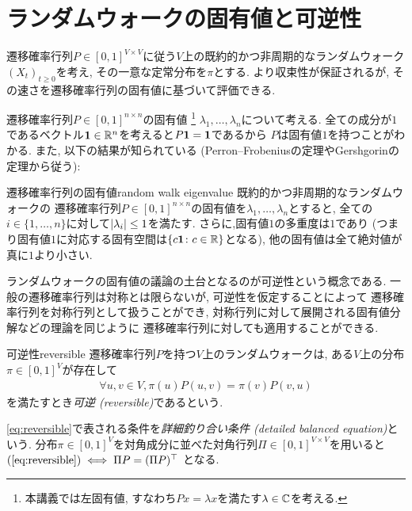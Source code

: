\section{ランダムウォークの固有値と可逆性}
遷移確率行列$P \in [0,1]^{V \times V}$に従う$V$上の既約的かつ非周期的なランダムウォーク$(X_t)_{t\ge 0}$を考え,
その一意な定常分布を$\pi$とする.
より収束性が保証されるが, その速さを遷移確率行列の固有値に基づいて評価できる.

遷移確率行列$P \in [0,1]^{n \times n}$の固有値
\footnote{本講義では左固有値, すなわち$Px=\lambda x$を満たす$\lambda\in \mathbb{C}$を考える.}
$\lambda_1,\dots,\lambda_n$について考える.
全ての成分が$1$であるベクトル$\mathbf{1}\in \mathbb{R}^n$を考えると$P\mathbf{1} = \mathbf{1}$であるから
$P$は固有値$1$を持つことがわかる.
また, 以下の結果が知られている (Perron--Frobeniusの定理やGershgorinの定理から従う):
\begin{lemma}{遷移確率行列の固有値}{random walk eigenvalue}
    既約的かつ非周期的なランダムウォークの
    遷移確率行列$P\in [0,1]^{n\times n}$の固有値を$\lambda_1,\dots,\lambda_n$とすると,
    全ての$i\in\{1,\dots,n\}$に対して$\lvert\lambda_i\rvert \le 1$を満たす.
    さらに,固有値$1$の多重度は$1$であり (つまり固有値$1$に対応する固有空間は$\{c\mathbf{1} \colon c \in \mathbb{R}\}$となる), 他の固有値は全て絶対値が真に$1$より小さい.
\end{lemma}
%

ランダムウォークの固有値の議論の土台となるのが可逆性という概念である.
一般の遷移確率行列は対称とは限らないが, 可逆性を仮定することによって
遷移確率行列を対称行列として扱うことができ,
対称行列に対して展開される固有値分解などの理論を同じように
遷移確率行列に対しても適用することができる.
%
\begin{definition}{可逆性}{reversible}
    遷移確率行列$P$を持つ$V$上のランダムウォークは,
    ある$V$上の分布$\pi \in [0,1]^V$が存在して
    \begin{align}
        \forall u,v\in V,\pi(u) P(u,v) = \pi(v) P(v,u) \label{eq:reversible}
    \end{align}
    を満たすとき\emph{可逆 (reversible)}であるという.
\end{definition}
\cref{eq:reversible}で表される条件を\emph{詳細釣り合い条件 (detailed balanced equation)}という.
分布$\pi\in [0,1]^V$を対角成分に並べた対角行列$\Pi\in[0,1]^{V\times V}$を用いると
$(\ref{eq:reversible}) \iff \Pi P = (\Pi P)^{\top}$
となる.

